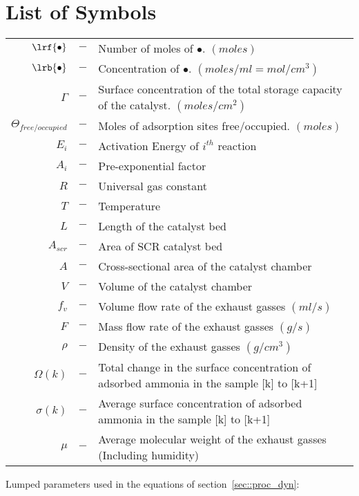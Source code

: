 \section*{List of Symbols}

\begin{table}[H]
    \begin{tabular}{r c l}
        $\lrf{\bullet}$ &$-$& Number of moles of $\bullet$. $(moles)$\\
        $\lrb{\bullet}$ &$-$& Concentration of $\bullet$. $(moles/ml = mol/cm^3)$\\
        $\Gamma$ &$-$& Surface concentration of the total storage capacity of the catalyst. $(moles/cm^2)$\\
        $\Theta_{free/occupied}$ &$-$& Moles of adsorption sites free/occupied. $(moles)$\\
        $E_i$ &$-$& Activation Energy of $i^{th}$ reaction\\
        $A_i$ &$-$& Pre-exponential factor\\
        $R$ &$-$& Universal gas constant\\
        $T$ &$-$& Temperature\\
        $L$ &$-$& Length of the catalyst bed\\
        $A_{scr}$ &$-$& Area of SCR catalyst bed\\
        $A$ &$-$& Cross-sectional area of the catalyst chamber\\
        $V$ &$-$& Volume of the catalyst chamber\\
        $f_v$ &$-$& Volume flow rate of the exhaust gasses $(ml/s)$\\
        $F$ &$-$& Mass flow rate of the exhaust gasses $(g/s)$\\
        $\rho$ &$-$& Density of the exhaust gasses $(g/cm^3)$\\
        $\Omega(k)$ &$-$& Total change in the surface concentration of adsorbed ammonia in the sample [k] to [k+1]\\
        $\sigma(k)$ &$-$& Average surface concentration of adsorbed ammonia in the sample [k] to [k+1]\\
        $\mu$ &$-$& Average molecular weight of the exhaust gasses (Including humidity)\\
    \end{tabular}
\end{table}

Lumped parameters used in the equations of section~\ref{sec::proc_dyn}:

